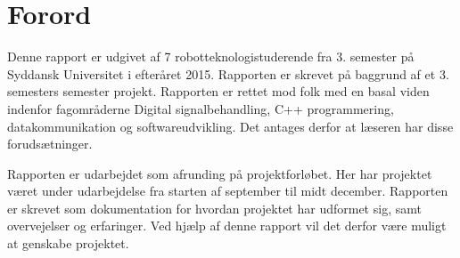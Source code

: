 \section*{Forord}
Denne rapport er udgivet af 7 robotteknologistuderende fra 3. semester på Syddansk Universitet i efteråret 2015. Rapporten er skrevet på baggrund af et 3. semesters semester projekt. 
Rapporten er rettet mod folk med en basal viden indenfor fagområderne Digital signalbehandling, C++ programmering, datakommunikation og softwareudvikling. Det antages derfor at læseren har disse forudsætninger.

Rapporten er udarbejdet som afrunding på projektforløbet. Her har projektet været under udarbejdelse fra starten af september til midt december. Rapporten er skrevet som dokumentation for hvordan projektet har udformet sig, samt overvejelser og erfaringer. Ved hjælp af denne rapport vil det derfor være muligt at genskabe projektet. 